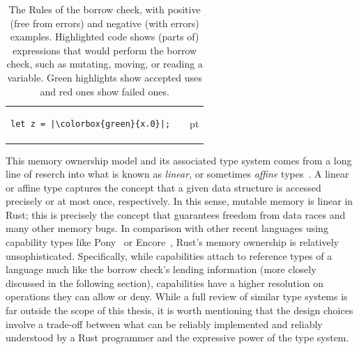 \documentclass[11pt,a4paper,twoside,openany]{report}
\begin{document}
{\begin{table}[h]
\begin{tabular}{p{} p{} p{}}
\begin{minipage}[t]{0.41\textwidth}
\begin{verbatim}
let z = |\colorbox{green}{x.0}|;
\end{verbatim}
\end{minipage}&%
  \begin{minipage}[t]{0.41\textwidth}
\begin{verbatim}
struct Point(u32, u32);
let x = {
    let pt = Point(6, 9);
    |\colorbox{red}{&pt}|
}; // pt goes out of scope

// ERROR: pt does not live
// long enough:
let z = |\colorbox{red}{x.0}|; 
\end{verbatim}
  \end{minipage}
\end{tabular}
\caption[The Rules of the Borrow Check]{The Rules of the borrow check, with
  positive (free from errors) and negative (with errors) examples. Highlighted
  code shows (parts of) expressions that would perform the borrow check, such as
  mutating, moving, or reading a variable. Green highlights show accepted uses
  and red ones show failed ones.}
  \label{tab:borrow-check}
\end{table}%
}




This memory ownership model and its associated type system comes from a long
line of reserch into what is known as \textit{linear}, or sometimes
\textit{affine} types~\cite{wadler1990linear}. A linear or affine type captures
the concept that a given data structure is accessed precisely or at most once,
respectively. In this sense, mutable memory is linear in Rust; this is precisely
the concept that guarantees freedom from data races and many other memory bugs.
In comparison with other recent languages using capability types like
Pony~\cite{clebsch2015pony, Clebsch:2015:DCS:2824815.2824816} or
Encore~\cite{castegren2018capability}, Rust's memory ownership is relatively
unsophisticated. Specifically, while capabilities attach to reference types of a
language much like the borrow check's lending information (more closely
discussed in the following section), capabilities have a higher resolution on
operations they can allow or deny. While a full review of similar type systems
is far outside the scope of this thesis, it is worth mentioning that the design
choices involve a trade-off between what can be reliably implemented and
reliably understood by a Rust programmer and the expressive power of the type
system.
\end{document}
